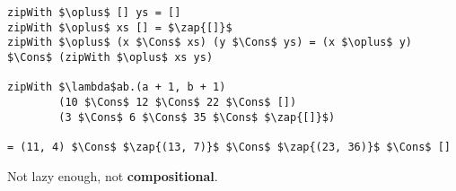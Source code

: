 \begin{frame}[t,fragile]
\vspace{35pt}


\begin{lstlisting}[mathescape=true,numbers=none]
zipWith $\oplus$ [] ys = []
zipWith $\oplus$ xs [] = $\zap{[]}$
zipWith $\oplus$ (x $\Cons$ xs) (y $\Cons$ ys) = (x $\oplus$ y) $\Cons$ (zipWith $\oplus$ xs ys)

zipWith $\lambda$ab.(a + 1, b + 1)
        (10 $\Cons$ 12 $\Cons$ 22 $\Cons$ [])
        (3 $\Cons$ 6 $\Cons$ 35 $\Cons$ $\zap{[]}$)

= (11, 4) $\Cons$ $\zap{(13, 7)}$ $\Cons$ $\zap{(23, 36)}$ $\Cons$ []
\end{lstlisting}

\vspace{5pt}
Not lazy enough, not \textbf{compositional}.

\end{frame}
